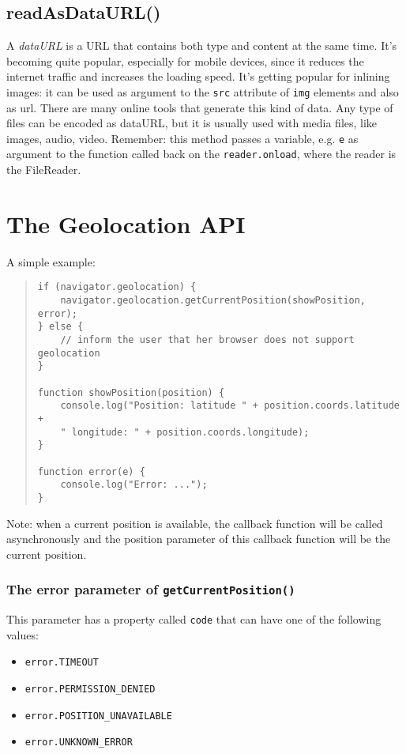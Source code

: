 \documentclass[a4paper,11pt]{book}
\begin{document}
\subsection{readAsDataURL()}
A \textit{dataURL} is a URL that contains both type and content at the same time.
It's becoming quite popular, especially for mobile devices, since it reduces the internet
traffic and increases the loading speed. It's getting popular for inlining images: it
can be used as argument to the \texttt{src} attribute of \texttt{img} elements and also
as url. There are many online tools that generate this kind of data. Any type of files
can be encoded as dataURL, but it is usually used with media files, like images, audio,
video.
Remember: this method passes a variable, e.g. \texttt{e} as argument to the function
called back on the \texttt{reader.onload}, where the reader is the FileReader.

\section{The Geolocation API}
A simple example:
\begin{verse}
\begin{verbatim}
if (navigator.geolocation) {
	navigator.geolocation.getCurrentPosition(showPosition, error);
} else {
	// inform the user that her browser does not support geolocation
}

function showPosition(position) {
	console.log("Position: latitude " + position.coords.latitude +
	" longitude: " + position.coords.longitude);
}

function error(e) {
	console.log("Error: ...");
}
\end{verbatim}
\end{verse}
Note: when a current position is available, the callback function will be called asynchronously
and the position parameter of this callback function will be the current position.
\subsubsection{The error parameter of \texttt{getCurrentPosition()}}
This parameter has a property called \texttt{code} that can have one of the following values:
\begin{itemize}
\item \texttt{error.TIMEOUT}
\item \texttt{error.PERMISSION\_DENIED}
\item \texttt{error.POSITION\_UNAVAILABLE}
\item \texttt{error.UNKNOWN\_ERROR}
\end{itemize}
\end{document}
